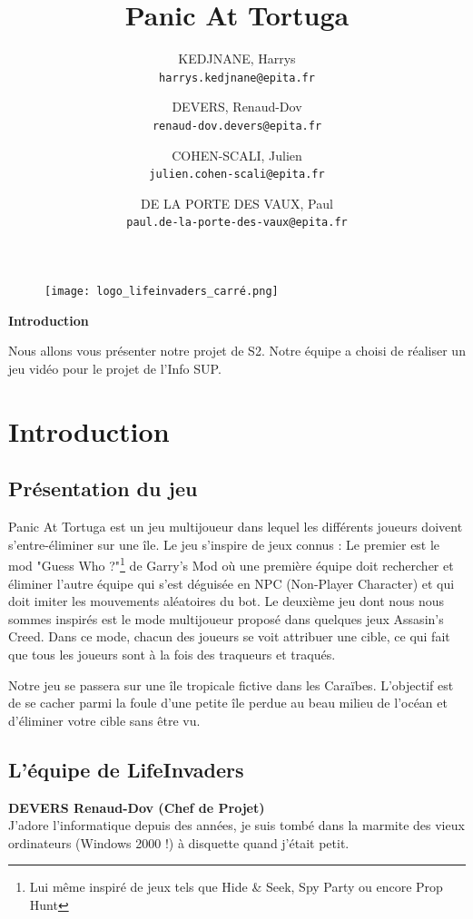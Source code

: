 \documentclass[french, 12pt]{article}
\title{Panic At Tortuga}
\author{
    KEDJNANE, Harrys\\
    \texttt{harrys.kedjnane@epita.fr}
    \and
    DEVERS, Renaud-Dov\\
    \texttt{renaud-dov.devers@epita.fr}
    \and
    COHEN-SCALI, Julien\\
    \texttt{julien.cohen-scali@epita.fr}
    \and
    DE LA PORTE DES VAUX, Paul\\
    \texttt{paul.de-la-porte-des-vaux@epita.fr}
    
}
\begin{document}
\begin{titlepage}
    \maketitle
    \begin{figure}[hbt!]
        \centering
        \texttt{[image: logo\_lifeinvaders\_carré.png]}
    \end{figure}
\end{titlepage}

\begin{center}
    \textbf{Introduction}

    Nous allons vous présenter notre projet de S2.
    Notre équipe a choisi de réaliser un jeu vidéo pour le projet de l'Info SUP.
\end{center}

\tableofcontents
\newpage

\section{Introduction}
\subsection{Présentation du jeu}
\begin{flushleft}
    Panic At Tortuga est un jeu multijoueur dans lequel les différents joueurs doivent s'entre-éliminer sur une île.
    Le jeu s'inspire de jeux connus : Le premier est le mod "Guess Who ?"\footnote{Lui même inspiré de jeux tels que Hide \& Seek, Spy Party ou encore Prop Hunt} de Garry's Mod
        où une première équipe doit rechercher et éliminer l'autre équipe qui s'est déguisée en NPC (Non-Player Character) et qui doit imiter les mouvements aléatoires du bot.
    Le deuxième jeu dont nous nous sommes inspirés est le mode multijoueur proposé dans quelques jeux Assasin's Creed.
    Dans ce mode, chacun des joueurs se voit attribuer une cible, ce qui fait que tous les joueurs sont à la fois des traqueurs et traqués.

    Notre jeu se passera sur une île tropicale fictive dans les Caraïbes.
    L'objectif est de se cacher parmi la foule d'une petite île perdue au beau milieu de l'océan et d'éliminer votre cible sans être vu.
\end{flushleft}

\subsection{L'équipe de LifeInvaders}
\textbf{DEVERS Renaud-Dov (Chef de Projet)} \\
J'adore l'informatique depuis des années, je suis tombé dans la marmite des vieux ordinateurs (Windows 2000 !) à disquette quand j'était petit.
\end{document}
